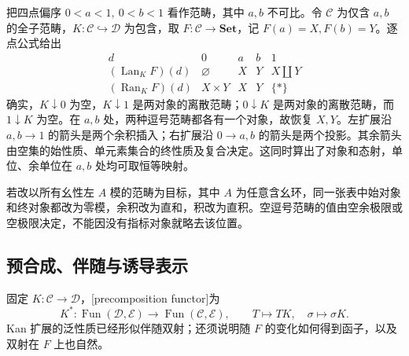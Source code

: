 \begin{example}[在有限偏序上补入一个积或余积]\label{b4:exm:kan-finite-poset}
	把四点偏序 \(0<a<1,\ 0<b<1\) 看作范畴，其中 \(a,b\) 不可比。令 \(\mathcal C\) 为仅含 \(a,b\) 的全子范畴，\(K:\mathcal C\hookrightarrow\mathcal D\) 为包含，取 \(F:\mathcal C\rightarrow\mathbf{Set}\)，记 \(F(a)=X,F(b)=Y\)。逐点公式给出
	\[
		\begin{array}{c|cccc}
			d&0&a&b&1\\ \hline
			(\operatorname{Lan}_K F)(d)&\varnothing&X&Y&X\amalg Y\\
			(\operatorname{Ran}_K F)(d)&X\times Y&X&Y&\{*\}
		\end{array}
	\]
	确实，\(K\downarrow0\) 为空，\(K\downarrow1\) 是两对象的离散范畴；\(0\downarrow K\) 是两对象的离散范畴，而 \(1\downarrow K\) 为空。在 \(a,b\) 处，两种逗号范畴都各有一个对象，故恢复 \(X,Y\)。左扩展沿 \(a,b\rightarrow1\) 的箭头是两个余积插入；右扩展沿 \(0\rightarrow a,b\) 的箭头是两个投影。其余箭头由空集的始性质、单元素集合的终性质及复合决定。这同时算出了对象和态射，单位、余单位在 \(a,b\) 处均可取恒等映射。

	\ProseParagraphBreak
	若改以所有幺性左 \(A\) 模的范畴为目标，其中 \(A\) 为任意含幺环，同一张表中始对象和终对象都改为零模，余积改为直和，积改为直积。空逗号范畴的值由空余极限或空极限决定，不能因没有指标对象就略去该位置。
\end{example}

\subsection{预合成、伴随与诱导表示}
\label{b4:subsec:0305:03}

固定 \(K:\mathcal C\rightarrow\mathcal D\)，[precomposition functor]为
\[
	K^*:\operatorname{Fun}(\mathcal D,\mathcal E)
	\longrightarrow\operatorname{Fun}(\mathcal C,\mathcal E),
	\qquad T\longmapsto TK,\quad \sigma\longmapsto\sigma K.
\]
Kan 扩展的泛性质已经形似伴随双射；还须说明随 \(F\) 的变化如何得到函子，以及双射在 \(F\) 上也自然。

